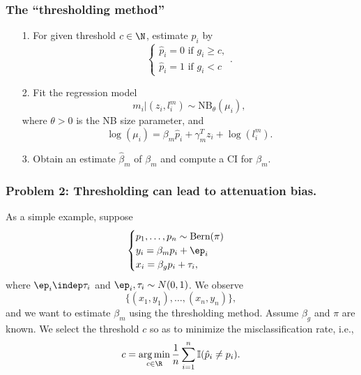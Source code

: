 \documentclass{beamer}
\DeclareMathOperator*{\argmin}{arg\,min}
\begin{document}
\begin{frame}
\frametitle{The ``thresholding method''}

\begin{itemize}
\item[1.] For given threshold $c \in \N$, estimate $p_i$ by $$ \begin{cases} \hat{p}_i = 0 \textrm{ if } g_i \geq c, \\ \hat{p}_i = 1 \textrm{ if } g_i < c \end{cases}.$$
\item[2.] Fit the regression model \cite{Sarkar2021}
$$ m_i | \left( z_i, l^m_i \right) \sim \textrm{NB}_\theta(\mu_i),$$ where $\theta >0$ is the NB size parameter, and $$\log\left(\mu_i\right) = \beta_m \hat{p}_i + \gamma^T_m z_i + \log\left( l_i^m\right).$$
\item[3.] Obtain an estimate $\hat{\beta}_m$ of $\beta_m$ and compute a CI for $\beta_m$.
\end{itemize}
\end{frame}



\begin{frame}
\frametitle{Problem 2: Thresholding can lead to attenuation bias.}


As a simple example, suppose
$$
\begin{cases}
p_1, \dots, p_n \sim \textrm{Bern}(\pi) \\
y_i = \beta_m p_i + \ep_i \\
x_i = \beta_g p_i + \tau_i,
\end{cases}
$$
where $\ep_i \indep \tau_i$ and $\ep_i, \tau_i \sim N(0,1)$. We observe
$$ \{(x_1, y_1), \dots, (x_n, y_n)\},$$ and we want to estimate $\beta_m$ using the thresholding method. Assume $\beta_g$ and $\pi$ are known. We select the threshold $c$ so as to minimize the misclassification rate, i.e., $$c = \argmin_{c \in \R} \frac{1}{n} \sum_{i=1}^n \mathbb{I}(\hat{p}_i \neq p_i).$$

\end{frame}


\end{document}
